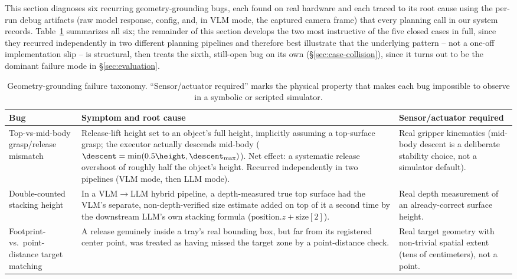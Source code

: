 This section diagnoses six recurring geometry-grounding bugs, each
found on real hardware and each traced to its root cause using the
per-run debug artifacts (raw model response, config, and, in VLM mode,
the captured camera frame) that every planning call in our system
records. Table~\ref{tab:taxonomy} summarizes all six; the remainder of
this section develops the two most instructive of the five closed cases
in full, since they recurred independently in two different planning
pipelines and therefore best illustrate that the underlying pattern --
not a one-off implementation slip -- is structural, then treats the
sixth, still-open bug on its own (\S\ref{sec:case-collision}), since it
turns out to be the dominant failure mode in \S\ref{sec:evaluation}.

\begin{table}[t]
\centering
\caption{Geometry-grounding failure taxonomy. ``Sensor/actuator required''
marks the physical property that makes each bug impossible to observe in
a symbolic or scripted simulator.}
\label{tab:taxonomy}
\begin{tabularx}{\textwidth}{@{}p{3.1cm}Xp{3.9cm}@{}}
\toprule
\textbf{Bug} & \textbf{Symptom and root cause} & \textbf{Sensor/actuator required} \\
\midrule
Top-vs-mid-body grasp/release mismatch &
  Release-lift height set to an object's full height, implicitly assuming
  a top-surface grasp; the executor actually descends mid-body
  ($\descent = \min(0.5\height, \descent_{\max})$). Net effect: a
  systematic release overshoot of roughly half the object's height.
  Recurred independently in two pipelines (VLM mode, then LLM mode). &
  Real gripper kinematics (mid-body descent is a deliberate stability
  choice, not a simulator default). \\
\addlinespace
Double-counted stacking height &
  In a VLM$\to$LLM hybrid pipeline, a depth-measured true top surface had
  the VLM's separate, non-depth-verified size estimate added on top of it
  a second time by the downstream LLM's own stacking formula
  ($\text{position}.z + \text{size}[2]$). &
  Real depth measurement of an already-correct surface height. \\
\addlinespace
Footprint- vs.\ point-distance target matching &
  A release genuinely inside a tray's real bounding box, but far from its
  registered center point, was treated as having missed the target zone
  by a point-distance check. &
  Real target geometry with non-trivial spatial extent (tens of
  centimeters), not a point. \\

\end{tabularx}
\end{table}
